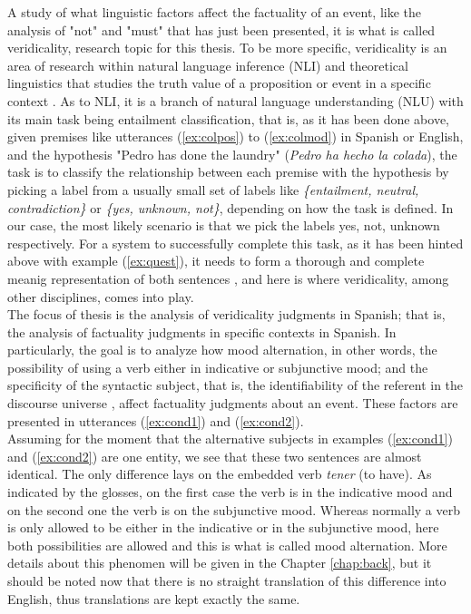 A study of what linguistic factors affect the factuality of an event, like the analysis of "not" and "must" that has just been presented, it is what is called veridicality, research topic for this thesis. To be more specific, veridicality is an area of research within natural language inference (NLI) and theoretical linguistics that studies the truth value of a proposition or event in a specific context \citep{giannakidou2014non,giannakidou2015mixed}. As to NLI, it is a branch of natural language understanding (NLU) with its main task being entailment classification, that is, as it has been done above, given premises like utterances (\ref{ex:colpos}) to (\ref{ex:colmod}) in Spanish or English, and the hypothesis "Pedro has done the laundry" (\textit{Pedro ha hecho la colada}), the task is to classify the relationship between each premise with the hypothesis by picking a label from a usually small set of labels like \textit{\{entailment, neutral, contradiction\}} \citep{williams2017broad} or \textit{\{yes, unknown, not\}}, depending on how the task is defined. In our case, the most likely scenario is that we pick the labels yes, not, unknown respectively. For a system to successfully complete this task, as it has been hinted above with example (\ref{ex:quest}), it needs to form a thorough and complete meanig representation of both sentences \citep{williams2017broad}, and here is where veridicality, among other disciplines, comes into play.\\ 

The focus of thesis is the analysis of veridicality judgments in Spanish; that is, the analysis of factuality judgments in specific contexts in Spanish. In particularly, the goal is to analyze how mood alternation, in other words, the possibility of using a verb either in indicative or subjunctive mood; and the specificity of the syntactic subject, that is, the identifiability of the referent in the discourse universe \citep{caudet1999expresiones}, affect factuality judgments about an event. These factors are presented in utterances (\ref{ex:cond1}) and (\ref{ex:cond2}).\\

Assuming for the moment that the alternative subjects in examples (\ref{ex:cond1}) and (\ref{ex:cond2}) are one entity, we see that these two sentences are almost identical. The only difference lays on the embedded verb \textit{tener} (to have). As indicated by the glosses, on the first case the verb is in the indicative mood and on the second one the verb is on the subjunctive mood. Whereas normally a verb is only allowed to be either in the indicative or in the subjunctive mood, here both possibilities are allowed and this is what is called mood alternation. More details about this phenomen will be given in the Chapter \ref{chap:back}, but it should be noted now that there is no straight translation of this difference into English, thus translations are kept exactly the same.\\

